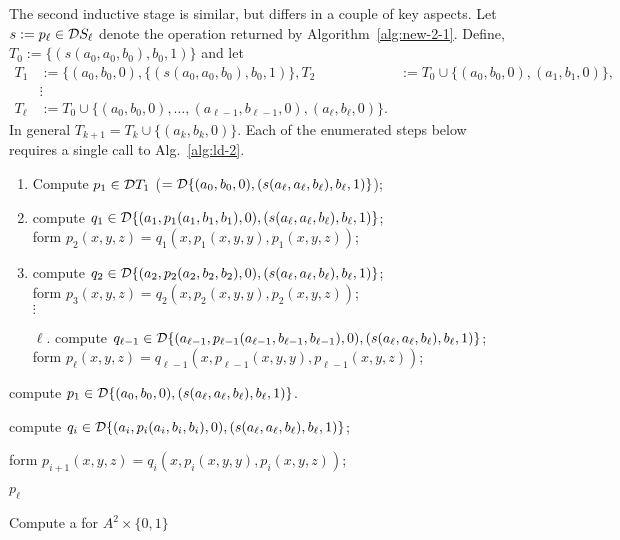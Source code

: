   
  
  



  The second inductive stage is similar, but differs in a couple of key aspects. 
Let $s := p_\ell \in \mathcal{D} S_\ell$ denote the operation returned by Algorithm~\ref{alg:new-2-1}.
Define, $T_0 := \{(s(a_{0}, a_{0}, b_{0}), b_{0}, 1)\}$ and let 
\begin{align*} 
  T_1 &:= \{(a_0, b_0, 0), \{(s(a_{0}, a_{0}, b_{0}), b_{0}, 1)\},
  T_2 &:=  T_0 \cup\{(a_0, b_0, 0), (a_1, b_1, 0)\},\\ 
  & \vdots\\
  T_\ell &:= T_0 \cup \{(a_0, b_0, 0), \dots,
(a_{\ell-1}, b_{\ell-1},0), (a_{\ell}, b_{\ell},0)\}.
\end{align*}
In general $T_{k+1} = T_{k} \cup \{(a_k, b_k, 0)\}$.
Each of the enumerated steps below requires a single call to Alg.~\ref{alg:ld-2}.
\begin{enumerate}[1.]
  \item Compute $p_1 \in \mathcal{D} T_1$ ($ = \mathcal{D} \{(a_0, b_0, 0), (s(a_{\ell}, a_{\ell}, b_{\ell}), b_{\ell}, 1)\}$);
  \item compute $q_1\in \mathcal{D} \{(a_1, p_1(a_1, b_1, b_1), 0), (s(a_{\ell}, a_{\ell}, b_{\ell}), b_{\ell}, 1)\}$; \\
  form $p_2(x,y,z) = q_1(x, p_1(x,y,y), p_1(x,y,z))$;
  \item compute $q_2\in \mathcal{D} \{(a_2, p_2(a_2, b_2, b_2), 0), (s(a_{\ell}, a_{\ell}, b_{\ell}), b_{\ell}, 1)\}$; \\
  form $p_3(x,y,z) = q_2(x, p_2(x,y,y), p_2(x,y,z))$;\\
  $\vdots$
  \item[$\ell$.] compute $q_{\ell-1}\in \mathcal{D} \{(a_{\ell-1}, p_{\ell-1}(a_{\ell-1}, b_{\ell-1}, b_{\ell-1}),0), (s(a_{\ell},a_{\ell}, b_{\ell}),  b_{\ell},1)\}$; \\
  form
  $p_{\ell}(x,y,z) = q_{\ell-1}(x, p_{\ell-1}(x,y,y), p_{\ell-1}(x,y,z))$;
\end{enumerate}



\begin{algorithm}
  
  compute $p_1 \in \mathcal{D} \{(a_0, b_0, 0), (s(a_{\ell}, a_{\ell}, b_{\ell}), b_{\ell}, 1)\}$. %
  
   {
    compute $q_i\in \mathcal{D} \{(a_i, p_i(a_i, b_i, b_i), 0), (s(a_{\ell}, a_{\ell}, b_{\ell}), b_{\ell}, 1)\}$;
  
    form $p_{i+1}(x,y,z) = q_i(x, p_i(x,y,y), p_i(x,y,z))$;
  }

  \Return $p_\ell$
  \caption{Compute a \ldto for $A^2 \times \{0,1\}$\label{alg:new-2-2}}
\end{algorithm}




